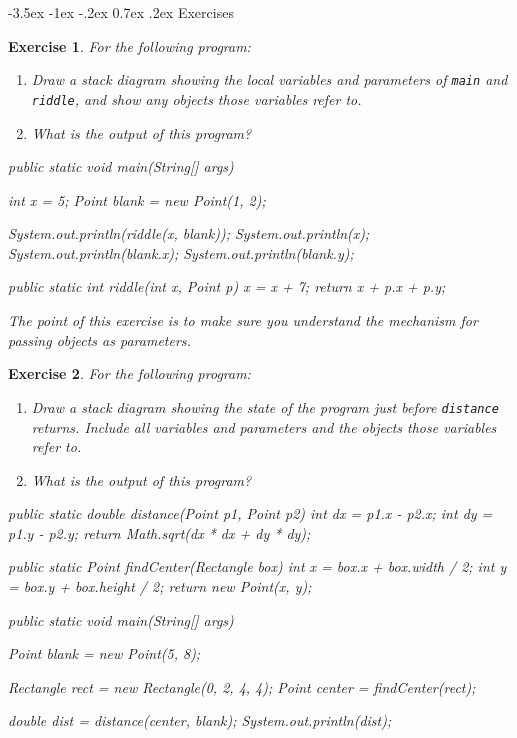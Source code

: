 \documentclass[12pt]{book}
\makeatletter
\renewcommand{\section}{\@startsection {section}{1}{\z@}%
    {-3.5ex \@plus -1ex \@minus -.2ex}%
    {0.7ex \@plus.2ex}%
    {\normalfont\Large\bfseries}}
\theoremstyle{exercise}
\newtheorem{exercise}{Exercise}[chapter]
\newcommand{\java}[1]{\lstinline{#1}} %
\makeatother
\begin{document}
\section{Exercises}


\begin{exercise}
For the following program:

\begin{enumerate}

\item Draw a stack diagram showing the local variables and parameters of \java{main} and \java{riddle}, and show any objects those variables refer to.

\item What is the output of this program?

\end{enumerate}

\begin{code}
    public static void main(String[] args) {
        int x = 5;
        Point blank = new Point(1, 2);

        System.out.println(riddle(x, blank));
        System.out.println(x);
        System.out.println(blank.x);
        System.out.println(blank.y);
    }

    public static int riddle(int x, Point p) {
        x = x + 7;
        return x + p.x + p.y;
    }
\end{code}

The point of this exercise is to make sure you understand the mechanism for passing objects as parameters.
\end{exercise}


\begin{exercise}
For the following program:

\begin{enumerate}

\item Draw a stack diagram showing the state of the program just before \java{distance} returns.
Include all variables and parameters and the objects those variables refer to.

\item What is the output of this program?

\end{enumerate}

\begin{code}
    public static double distance(Point p1, Point p2) {
        int dx = p1.x - p2.x;
        int dy = p1.y - p2.y;
        return Math.sqrt(dx * dx + dy * dy);
    }

    public static Point findCenter(Rectangle box) {
        int x = box.x + box.width / 2;
        int y = box.y + box.height / 2;
        return new Point(x, y);
    }

    public static void main(String[] args) {
        Point blank = new Point(5, 8);

        Rectangle rect = new Rectangle(0, 2, 4, 4);
        Point center = findCenter(rect);

        double dist = distance(center, blank);
        System.out.println(dist);
    }
\end{code}

\end{exercise}
\end{document}

